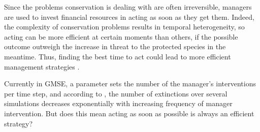 \documentclass[12pt,a4paper]{article}
\begin{document}
Since the problems conservation is dealing with are often irreversible, managers are used to invest financial resources in acting as soon as they get them.
Indeed, the complexity of conservation problems results in temporal heterogeneity, so acting can be more efficient at certain moments than others, if the possible outcome outweigh the increase in threat to the protected species in the meantime.
Thus, finding the best time to act could lead to more efficient management strategies \citep{Iacona2017waiting}.
%

Currently in GMSE, a parameter sets the number of the manager's interventions per time step, and according to \cite{duthie2018}, the number of extinctions over several simulations decreases exponentially with increasing frequency of manager intervention.
But does this mean acting as soon as possible is always an efficient strategy?\\ %
\end{document}
